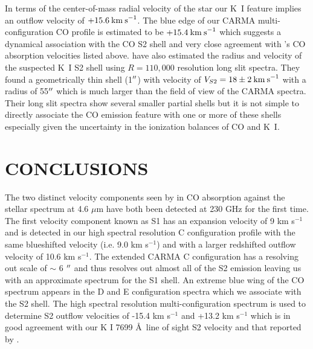 \documentclass[iop]{emulateapj}
\begin{document}
In terms of the center-of-mass radial velocity of the star our K~I feature implies an outflow velocity of $+15.6\>{\rm km\>s}^{-1}$. The blue edge of our CARMA multi-configuration CO profile is estimated to be $+15.4\>{\rm km\>s}^{-1}$  which suggests a dynamical association with the CO S2 shell and very close agreement with \citeauthor{1979ApJ...233L.135B}'s \citeyearpar{1979ApJ...233L.135B} CO absorption velocities listed above. \cite{2002A&A...386.1009P} have also estimated the radius and velocity of the suspected K~I S2 shell using $R=110,000$ resolution long slit spectra. They found a geometrically thin shell (1$\mbox{$^{\prime\prime}$}$) with velocity of $V_{S2}=18\pm 2\>{\rm km\>s}^{-1}$ with a radius of 55$\mbox{$^{\prime\prime}$}$ which is much larger than the field of view of the CARMA spectra. Their long slit spectra show several smaller partial shells but it is not simple to directly associate the CO emission feature with one or more of these shells especially given the uncertainty in the ionization balances of CO and K~I.

\section{CONCLUSIONS}
The two distinct velocity components seen by \cite{1979ApJ...233L.135B} in CO absorption against the stellar spectrum at 4.6 $\mu$m have both been detected at 230 GHz for the first time. The first velocity component known as S1 has an expansion velocity of 9 km s${}^{-1}$ \citep{1979ApJ...233L.135B} and is detected in our high spectral resolution C configuration profile with the same blueshifted velocity (i.e. 9.0 km s${}^{-1}$) and with a larger redshifted outflow velocity of 10.6 km s${}^{-1}$. The extended CARMA C configuration has a resolving out scale of $\sim$ 6 $\mbox{$^{\prime\prime}$}$ and thus resolves out almost all of the S2 emission leaving us with an approximate spectrum for the S1 shell. An extreme blue wing of the CO spectrum appears in the D and E configuration spectra which we associate with the S2 shell. The high spectral resolution multi-configuration spectrum is used to determine S2 outflow velocities of -15.4 km s${}^{-1}$ and +13.2 km s${}^{-1}$ which is in good agreement with our K I 7699 \AA \ line of sight S2 velocity and that reported by \cite{1979ApJ...233L.135B}. 
\end{document}
